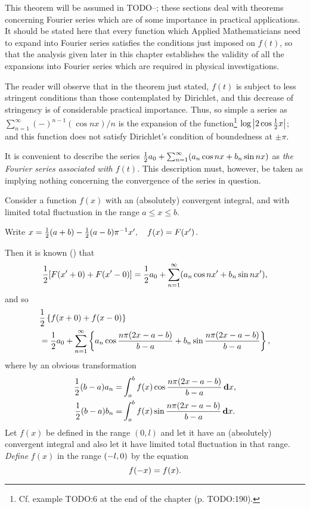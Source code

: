 This theorem will be assumed in
TODO--;
these sections deal with theorems concerning Fourier series which
are of some importance
in practical applications. It should be stated here that every
function which Applied Mathematicians need to expand into Fourier
series satisfies the conditions just imposed on $f(t)$, so that the
analysis given later in this chapter establishes the validity of all
the expansions into Fourier series which are required in physical
investigations.

The reader will observe that in the theorem just stated,
$f(t)$ is subject to less stringent conditions than those contemplated by
Dirichlet, and this decrease of stringency is of
considerable practical importance. Thus, so simple a series as
$\sum_{n=1}^{\infty} (-)^{n-1} (\cos nx) / n$
is the
expansion of the function\footnote{Cf. example TODO:6 at the end of the chapter (p. TODO:190).}
$\log \absval{2 \cos \half x}$; and this function
does not satisfy Dirichlet's condition of boundedness at $\pm \pi$.

It is convenient to describe the series
$\half a_{0} + \sum_{n=1}^{\infty} (a_{n} \cos nx + b_{n} \sin nx)$
as \emph{the Fourier series associated with $f(t)$}. This description must,
however, be
%
%
taken as implying nothing concerning the convergence of the series in
question.


Consider a function $f(x)$ with an (absolutely) convergent integral,
and with limited total fluctuation in the range $a \leq x \leq b$.

Write
$x = \half (a + b) - \half (a-b) \pi^{-1} x',
\quad
f(x) = F(x')$.

Then it is known () that
$$
\half [F(x'+0) + F(x'-0)]
=
\half a_{0} + \sum_{n=1}^{\infty} (a_{n} \cos nx' + b_{n} \sin nx'),
$$
and so
\begin{align*}
  & \half \thebrace{ f(x+0) + f(x-0)}
  \\
  &
  \hfill
  =
  \half a_{0}
  +
  \sum_{n=1}^{\infty}
  \thebrace{
    a_{n} \cos \frac{n \pi (2x-a-b)}{b-a}
    +
    b_{n} \sin \frac{n \pi (2x-a-b)}{b-a}
  },
\end{align*}
where by an obvious transformation
\begin{align*}
  \half (b-a) a_{n} =& \int_{a}^{b} f(x) \cos \frac{n \pi (2x-a-b)}{b-a} \dmeasure x,
  \\
  \half (b-a) b_{n} =& \int_{a}^{b} f(x) \sin \frac{n \pi (2x-a-b)}{b-a} \dmeasure x
  .
\end{align*}
Let $f(x)$ be defined in the range $(0,l)$ and let it have an
(absolutely) convergent integral and also let it have limited
total fluctuation in that range.
\emph{Define} $f(x)$ in the range
$\wandwtypo{(0,-l)}{(-l,0)}$
by the equation
$$
f(-x) = f(x).\index{Even functions}
$$

